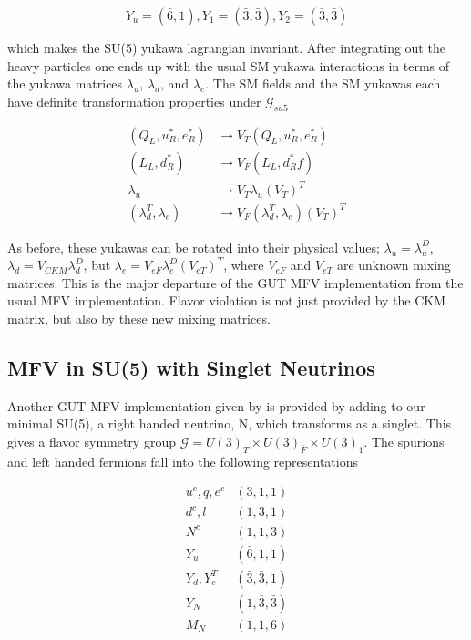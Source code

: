 \documentclass[aps,onecolumn,twoside,secnumarabic,balancelastpage,amsmath,amssymb,nofootinbib,hyperref=pdftex]{revtex4}
\begin{document}
\begin{equation}
Y_{u} = (\bar{6},1), Y_{1} = (\bar{3}, \bar{3}), Y_{2} = (\bar{3}, \bar{3})
\end{equation}

which makes the SU(5) yukawa lagrangian invariant. After integrating out the heavy particles one ends up with the usual SM yukawa interactions in terms of the yukawa matrices $\lambda_{u}$, $\lambda_{d}$, and $\lambda_{e}$. The SM fields and the SM yukawas each have definite transformation properties under $\mathcal{G}_{su5}$

\begin{align}
(Q_{L}, u^{*}_{R},e^{*}_{R}) &\rightarrow V_{T}(Q_L, u^{*}_{R},e^{*}_{R})\\
(L_{L}, d^{*}_{R}) &\rightarrow V_{F}(L_{L}, d^{*}_{R}f)\\
\lambda_{u} &\rightarrow V_{T}\lambda_{u}(V_{T})^{T}\\
(\lambda_{d}^{T}, \lambda_{e}) &\rightarrow V_{F}(\lambda_{d}^{T}, \lambda_{e})(V_{T})^{T}
\end{align}

As before, these yukawas can be rotated into their physical values; $\lambda_{u} = \lambda^{D}_{u}$, $\lambda_{d} = V_{CKM}\lambda^{D}_{d}$, but $\lambda_{e} = V_{eF}\lambda^{D}_{e}(V_{eT})^{T}$, where $V_{eF}$ and $V_{eT}$ are unknown mixing matrices. This is the major departure of the GUT MFV implementation from the usual MFV implementation. Flavor violation is not just provided by the CKM matrix, but also by these new mixing matrices. 

\subsection{MFV in SU(5) with Singlet Neutrinos}
Another GUT MFV implementation given by \cite{Alonso} is provided by adding to our minimal SU(5), a right handed neutrino, N, which transforms as a singlet. This gives a flavor symmetry group $\mathcal{G} = U(3)_{T} \times U(3)_{\bar{F}} \times U(3)_{1}$. The spurions and left handed fermions fall into the following representations

\begin{align}
u^{c},q,e^{c}&(3,1,1)\\
d^{c},l&(1,3,1)\\
N^{c}&(1,1,3)\\
Y_{u}&(\bar{6},1,1)\\
Y_{d},Y^{T}_{e}&(\bar{3},\bar{3},1)\\
Y_{N}&(1,\bar{3},\bar{3})\\
M_{N}&(1,1,6)\\
\end{align}
\end{document}
